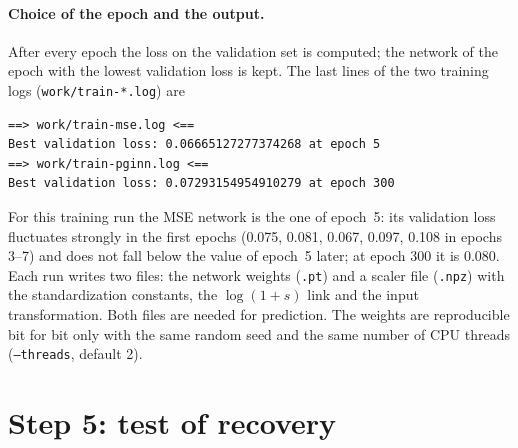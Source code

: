 \documentclass[11pt]{article}
\newcommand{\file}[1]{\texttt{#1}}
\begin{document}
\paragraph{Choice of the epoch and the output.}
After every epoch the loss on the validation set is computed; the
network of the epoch with the lowest validation loss is kept.
The last lines of the two training logs (\file{work/train-*.log}) are
\begin{lstlisting}
==> work/train-mse.log <==
Best validation loss: 0.06665127277374268 at epoch 5
==> work/train-pginn.log <==
Best validation loss: 0.07293154954910279 at epoch 300
\end{lstlisting}
For this training run the MSE network is the one of epoch~5: its
validation loss fluctuates strongly in the first epochs (0.075, 0.081,
0.067, 0.097, 0.108 in epochs 3--7) and does not fall below the value of
epoch~5 later; at epoch 300 it is 0.080.
Each run writes two files: the network weights (\file{.pt}) and a scaler
file (\file{.npz}) with the standardization constants, the
$\log(1{+}s)$ link and the input transformation.
Both files are needed for prediction.
The weights are reproducible bit for bit only with the same random seed
and the same number of CPU threads (\texttt{--threads}, default 2).

\section{Step 5: test of recovery}\label{sec:step5}
\end{document}
